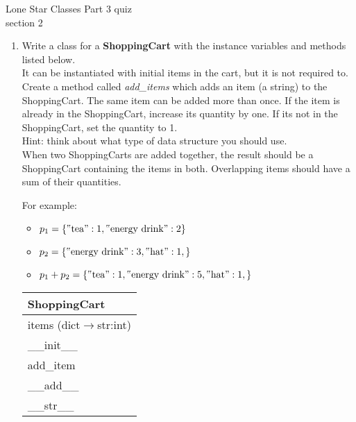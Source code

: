\documentclass{article}
\newcommand{\csqt}[1]{\text{\reflectbox{''}#1''}}  %
\begin{document}
\pagebreak
Lone Star \hfill Classes Part 3 quiz\\
section 2\\
\begin{enumerate}
	\item
		Write a class for a \textbf{ShoppingCart} with the instance variables and methods listed 
		below.\\
		It can be instantiated with initial items in the cart, but it is not required to.\\
		Create a method called \textit{add\_items} which adds an item (a string) to the 
		ShoppingCart. The same item can be added more than once. If the item is already in the 
		ShoppingCart, increase its quantity by one. If its not in the ShoppingCart, set the 
		quantity to 1.\\ Hint: think about what type of data structure you should use. \\
		When two ShoppingCarts are added together, the result should be a ShoppingCart 
		containing the items in both. Overlapping items should have a sum of their quantities.

		\begin{minipage}[t]{0.65\textwidth}
			For example:
			\begin{itemize}
				\item $p_1 = \{\csqt{tea}:1, \csqt{energy drink}:2 \}$
				\item $p_2 = \{\csqt{energy drink}:3, \csqt{hat}:1, \}$
				\item $p_1 + p_2 = \{\csqt{tea}:1, \csqt{energy drink}:5, \csqt{hat}:1, \}$
			\end{itemize}		
		\end{minipage}
		\hfill
		\begin{minipage}[t]{0.32\textwidth}
			\vspace{0.1em}
			\begin{flushright}
				\begin{tabular}{|l|} \hline
					ShoppingCart \\ \hline
					items (dict$\rightarrow$str:int) \\ \hline
					\_\_init\_\_ \\
					add\_item \\
					\_\_add\_\_ \\
					\_\_str\_\_ \\ \hline
				\end{tabular}
			\end{flushright}
		\end{minipage}
		

\end{enumerate}
\end{document}
